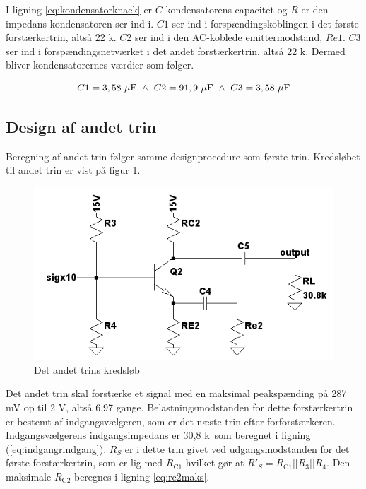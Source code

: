 I ligning \ref{eq:kondensatorknaek} er $C$ kondensatorens capacitet og $R$ er den impedans kondensatoren ser ind i. 
$C1$ ser ind i forspændingskoblingen i det første forstærkertrin, altså 22 k\Ohm. $C2$ ser ind i den AC-koblede emittermodstand, $Re1$. $C3$ ser ind i forspændingsnetværket i det andet forstærkertrin, altså 22 k\Ohm. Dermed bliver kondensatorernes værdier som følger.

\begin{equation}
C1=3,58~\mathrm{\mu F}~\wedge ~C2=91,9~\mathrm{\mu F}~\wedge ~C3=3,58~\mathrm{\mu F}
\end{equation}



\subsection*{Design af andet trin}
Beregning af andet trin følger samme designprocedure som første trin. Kredsløbet til andet trin er vist på figur \ref{fig:andettrinkreds}.

\begin{figure}[h]
\centering
\includegraphics[scale=.6]{teknisk/forforstaerker/andettrinkreds.png}
\caption{Det andet trins kredsløb}
\label{fig:andettrinkreds}
\end{figure}

Det andet trin skal forstærke et signal med en maksimal peakspænding på 287 mV op til 2 V, altså 6,97 gange. Belastningsmodstanden for dette forstærkertrin er bestemt af indgangsvælgeren, som er det næste trin efter forforstærkeren. Indgangsvælgerens indgangsimpedans er 30,8 k\ohm~som beregnet i ligning (\ref{eq:indgangrindgang}). $R_S$ er i dette trin givet ved udgangsmodstanden for det første forstærkertrin, som er lig med $R_{\mathrm{C1}}$ hvilket gør at $R'_S = R_{\mathrm{C1}} || R_3 || R_4$. Den maksimale $R_{\mathrm{C2}}$ beregnes i ligning \ref{eq:rc2maks}.

